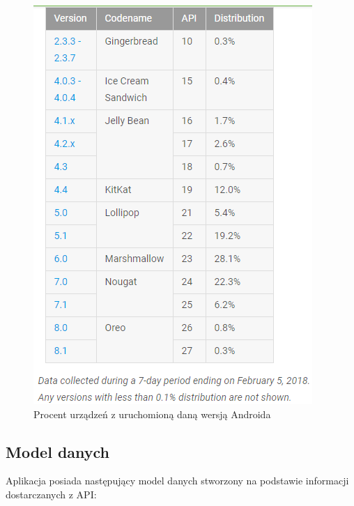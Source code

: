 \documentclass[twoside]{projektInzynierskiMS}
\begin{document}
\begin{figure}[h]
  \centering
  \includegraphics[width=0.6\linewidth]{img/android/stats.png}
  \caption{Procent urządzeń z uruchomioną daną wersją Androida}
  \label{fig:androidStats}
\end{figure}

\subsection{Model danych}
Aplikacja posiada następujący model danych stworzony na podstawie informacji dostarczanych z API:
\end{document}
